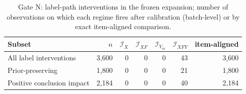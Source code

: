 \begin{table}[!t]
\caption{Gate N: label-path interventions in the frozen expansion; number of observations on which each regime fires after calibration (batch-level) or by exact item-aligned comparison.}
\label{tab:s-labelpath}
\centering
\scriptsize
\setlength{\tabcolsep}{2.5pt}
\begin{tabular}{@{}lrrrrrr@{}}
\toprule
Subset & $n$ & $\mathcal I_X$ & $\mathcal I_{XF}$ & $\mathcal I_{Y_m}$ & $\mathcal I_{XFY}$ & item-aligned \\
\midrule
All label interventions & 3,600 & 0 & 0 & 0 & 43 & 3,600 \\
Prior-preserving & 1,800 & 0 & 0 & 0 & 21 & 1,800 \\
Positive conclusion impact & 2,184 & 0 & 0 & 0 & 40 & 2,184 \\
\bottomrule
\end{tabular}
\end{table}
